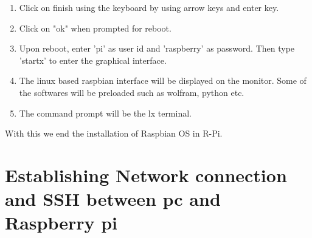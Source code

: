 \documentclass[11pt,a4paper]{report}
\begin{document}
\begin{enumerate}
\begin{itemize}
\begin{figure}[h!]
				\centering
				\caption{}	
			\end{figure}
		\end{itemize}
	\newpage
	
	\item Click on finish using the keyboard by using arrow keys and enter key.
	\item Click on "ok" when prompted for reboot.
	\item Upon reboot, enter 'pi' as user id and 'raspberry' as password. Then type 'startx' to enter the graphical interface.
	\item The linux based raspbian interface will be displayed on the monitor. Some of the softwares will be preloaded such as wolfram, python etc.
	\item The command prompt will be the lx terminal.
	\end{enumerate}
	
	With this we end the installation of Raspbian OS in R-Pi.
	
	\vspace{0.4cm} 
	\newpage
	
	\newpage
	\chapter{Establishing Network connection and SSH between pc and Raspberry pi }
\end{document}
